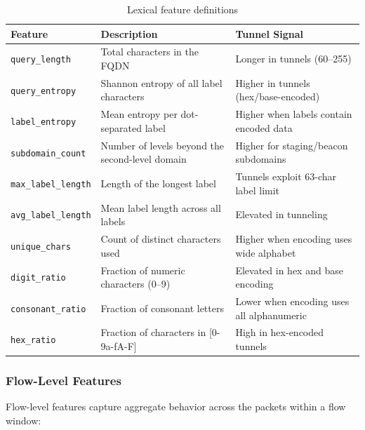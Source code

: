 \documentclass[12pt,a4paper]{article}
\begin{document}
\begin{table}[H]
\centering
\begin{tabular}{@{}lp{7cm}l@{}}
\toprule
\textbf{Feature} & \textbf{Description} & \textbf{Tunnel Signal} \\
\midrule
\texttt{query\_length} & Total characters in the FQDN & Longer in tunnels (60--255) \\
\texttt{query\_entropy} & Shannon entropy of all label characters & Higher in tunnels (hex/base-encoded) \\
\texttt{label\_entropy} & Mean entropy per dot-separated label & Higher when labels contain encoded data \\
\texttt{subdomain\_count} & Number of levels beyond the second-level domain & Higher for staging/beacon subdomains \\
\texttt{max\_label\_length} & Length of the longest label & Tunnels exploit 63-char label limit \\
\texttt{avg\_label\_length} & Mean label length across all labels & Elevated in tunneling \\
\texttt{unique\_chars} & Count of distinct characters used & Higher when encoding uses wide alphabet \\
\texttt{digit\_ratio} & Fraction of numeric characters (0--9) & Elevated in hex and base encoding \\
\texttt{consonant\_ratio} & Fraction of consonant letters & Lower when encoding uses all alphanumeric \\
\texttt{hex\_ratio} & Fraction of characters in [0-9a-fA-F] & High in hex-encoded tunnels \\
\bottomrule
\end{tabular}
\caption{Lexical feature definitions}
\end{table}

\subsubsection{Flow-Level Features}

Flow-level features capture aggregate behavior across the packets within a flow window:
\end{document}
